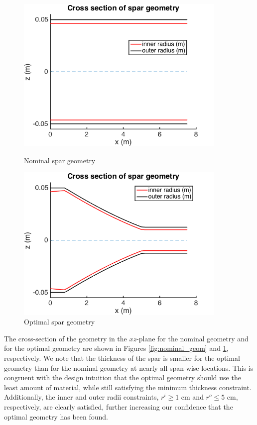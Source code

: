 \documentclass[11pt]{article}
\begin{document}
\begin{figure}[hbt!]
\centering
\begin{minipage}[b]{0.4\textwidth}
\includegraphics[width=0.9\textwidth]{nominal_geom}
\caption{Nominal spar geometry}
\label{fig:nominal_geom}
\end{minipage}
\begin{minipage}[b]{0.4\textwidth}
\includegraphics[width=0.9\textwidth]{optimal_geom}
\caption{Optimal spar geometry}
\label{fig:optimal_geom}
\end{minipage}
\end{figure}

The cross-section of the geometry in the $xz$-plane
for the nominal geometry and for the optimal
geometry are shown in Figures \ref{fig:nominal_geom}
and \ref{fig:optimal_geom}, respectively.
We note that the thickness of the spar is smaller for
the optimal geometry than for the nominal geometry
at nearly all span-wise locations. This is congruent
with the design intuition that the optimal geometry
should use the least amount of material, while still
satisfying the minimum thickness constraint. Additionally,
the inner and outer radii constraints, $r^i \geq 1$ cm
and $r^o \leq 5$ cm, respectively, are clearly
satisfied, further increasing our confidence that
the optimal geometry has been found.
\end{document}
